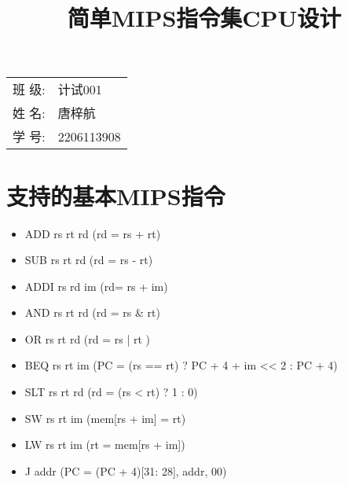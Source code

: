 \documentclass{article}
\title{\heiti 简单MIPS指令集CPU设计 }
\begin{document}
	
	\maketitle
	
	\vspace{5cm}
	
	\begin{table}[h]
		\centering
		\begin{Large}
			\begin{tabular}{p{3cm} p{7cm}<{\centering}}
				班 \qquad 级:      & 计试001   \\ \cline{2-2}
				姓 \qquad 名:      & 唐梓航   \\ \cline{2-2}
				学 \qquad 号:      & 2206113908   \\ \cline{2-2}
			\end{tabular}
		\end{Large}		
	\end{table}
	
	\newpage
	
	\tableofcontents
	
	\newpage
	
	\section{支持的基本MIPS指令}
	\begin{itemize}
		\item ADD rs rt rd (rd = rs + rt)
		\item SUB rs rt rd (rd = rs - rt)
		\item ADDI rs rd im (rd= rs + im)
		\item AND rs rt rd (rd = rs \& rt)
		\item OR rs rt rd (rd = rs | rt )
		\item BEQ rs rt im (PC = (rs == rt) ? PC + 4 + im << 2 : PC + 4)
		\item SLT rs rt rd (rd = (rs < rt) ? 1 : 0)
		\item SW rs rt im (mem[rs + im] = rt)
		\item  LW rs rt im (rt = mem[rs + im])
		\item  J addr (PC = {(PC + 4)[31: 28], addr, 00})
	\end{itemize}
	
	
\end{document}
